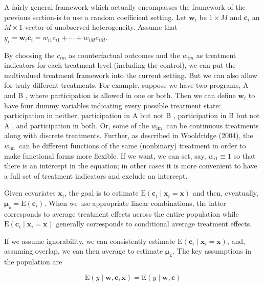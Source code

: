 \documentclass[10pt]{article}
\begin{document}
A fairly general framework-which actually encompasses the framework of the previous section-is to use a random coefficient setting. Let $\mathbf{w}_{i}$ be $1 \times M$ and $\mathbf{c}_{i}$ an $M \times 1$ vector of unobserved heterogeneity. Assume that\\
$y_{i}=\mathbf{w}_{i} \mathbf{c}_{i}=w_{i 1} c_{i 1}+\cdots+w_{i M} c_{i M}$.

By choosing the $c_{i m}$ as counterfactual outcomes and the $w_{i m}$ as treatment indicators for each treatment level (including the control), we can put the multivalued treatment framework into the current setting. But we can also allow for truly different treatments. For example, suppose we have two programs, A and B , where participation is allowed in one or both. Then we can define $\mathbf{w}_{i}$ to have four dummy variables indicating every possible treatment state: participation in neither, participation in A but not B , participation in B but not A , and participation in both. Or, some of the $w_{\text {im }}$ can be continuous treatments along with discrete treatments. Further, as described in Wooldridge (2004), the $w_{\text {im }}$ can be different functions of the same (nonbinary) treatment in order to make functional forms more flexible. If we want, we can set, say, $w_{i 1} \equiv 1$ so that there is an intercept in the equation; in other cases it is more convenient to have a full set of treatment indicators and exclude an intercept.

Given covariates $\mathbf{x}_{i}$, the goal is to estimate $\mathrm{E}\left(\mathbf{c}_{i} \mid \mathbf{x}_{i}=\mathbf{x}\right)$ and then, eventually, $\boldsymbol{\mu}_{\mathbf{c}}=\mathrm{E}\left(\mathbf{c}_{i}\right)$. When we use appropriate linear combinations, the latter corresponds to average treatment effects across the entire population while $\mathrm{E}\left(\mathbf{c}_{i} \mid \mathbf{x}_{i}=\mathbf{x}\right)$ generally corresponds to conditional average treatment effects.

If we assume ignorability, we can consistently estimate $\mathrm{E}\left(\mathbf{c}_{i} \mid \mathbf{x}_{i}=\mathbf{x}\right)$, and, assuming overlap, we can then average to estimate $\boldsymbol{\mu}_{\mathbf{c}}$. The key assumptions in the population are


\begin{equation*}
\mathrm{E}(y \mid \mathbf{w}, \mathbf{c}, \mathbf{x})=\mathrm{E}(y \mid \mathbf{w}, \mathbf{c}) \tag{21.124}
\end{equation*}
\end{document}
